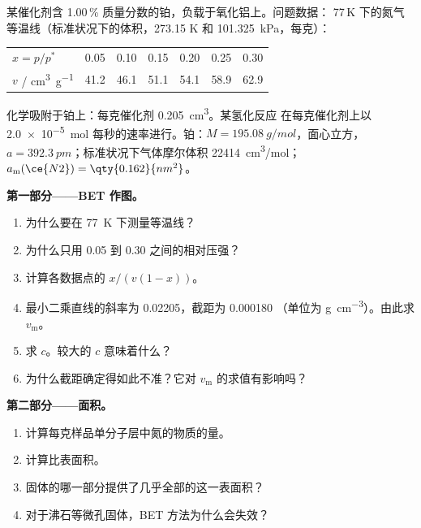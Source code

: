 \begin{problem}
\label{pb:b3:surfaces-catalysis:1}
某催化剂含 1.00\,\% 质量分数的铂，负载于氧化铝上。问题数据：
77\,K 下的氮气等温线（标准状况下的体积，273.15 K 和
\qty{101.325}{kPa}，每克）：
\begin{center}\small
\begin{tabular}{lcccccc}
\hline
$x = p/p^*$ & 0.05 & 0.10 & 0.15 & 0.20 & 0.25 & 0.30 \\
$v$ / \unit{cm^3.g^{-1}} & 41.2 & 46.1 & 51.1 & 54.1 & 58.9 & 62.9 \\ \hline
\end{tabular}
\end{center}
 化学吸附于铂上：每克催化剂 \qty{0.205}{cm^3}。某氢化反应
在每克催化剂上以 \qty{2.0e-5}{mol} 每秒的速率进行。铂：$M = \qty{195.08}{g/mol}$，面心立方，
$a = \qty{392.3}{pm}$；标准状况下气体摩尔体积 \qty{22414}{cm^3/mol}；
$a_{\mathrm m}(\ce{N2}) = \qty{0.162}{nm^2}$。

\medskip\noindent\textbf{第一部分——BET 作图。}
\begin{enumerate}
  \item 为什么要在 \qty{77}{K} 下测量等温线？
  \item 为什么只用 0.05 到 0.30 之间的相对压强？
  \item 计算各数据点的 $x/(v(1 - x))$。
  \item 最小二乘直线的斜率为 \num{0.02205}，截距为 \num{0.000180}
        （单位为 \unit{g.cm^{-3}}）。由此求 $v_{\mathrm m}$。
  \item 求 $c$。较大的 $c$ 意味着什么？
  \item 为什么截距确定得如此不准？它对 $v_{\mathrm m}$ 的求值有影响吗？
\end{enumerate}

\medskip\noindent\textbf{第二部分——面积。}
\begin{enumerate}[resume]
  \item 计算每克样品单分子层中氮的物质的量。
  \item 计算比表面积。
  \item 固体的哪一部分提供了几乎全部的这一表面积？
  \item 对于沸石等微孔固体，BET 方法为什么会失效？
\end{enumerate}


\end{problem}
